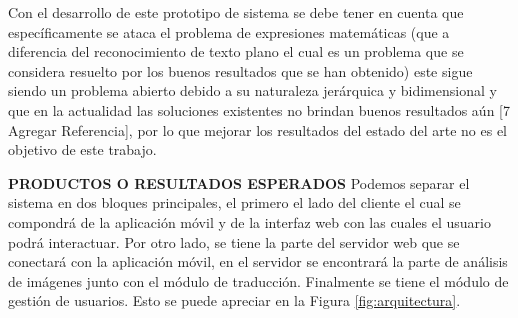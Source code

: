 Con el desarrollo de este prototipo de sistema se debe tener en cuenta que específicamente se ataca el problema de expresiones matemáticas (que a diferencia del reconocimiento de texto plano el cual es un problema que se considera resuelto por los buenos resultados que se han obtenido) este sigue siendo un problema abierto debido a su naturaleza jerárquica y bidimensional y que en la actualidad las soluciones existentes no brindan buenos resultados aún [7 Agregar Referencia], por lo que mejorar los resultados del estado del arte no es el objetivo de este trabajo.


\newpage

\textbf{PRODUCTOS O RESULTADOS ESPERADOS}
Podemos separar el sistema en dos bloques principales, el primero el lado del cliente el cual se compondrá de la aplicación móvil y de la interfaz web con las cuales el usuario podrá interactuar. Por otro lado, se tiene la parte del servidor web que se conectará con la aplicación móvil, en el servidor se encontrará la parte de análisis de imágenes junto con el módulo de traducción. Finalmente se tiene el módulo de gestión de usuarios. Esto se puede apreciar en la Figura \ref{fig:arquitectura}.%

